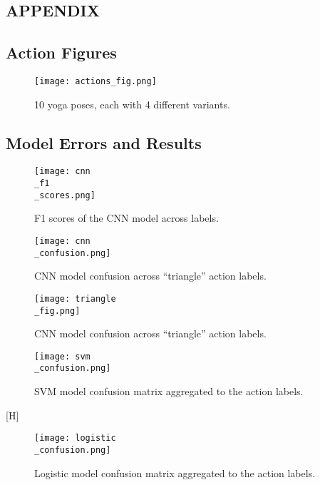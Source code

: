 \documentclass[
	a4paper, %
	10pt, %
	unnumberedsections, %
	twoside, %
]{t0004}
\begin{document}


\clearpage
\begin{appendices}
\onecolumn
\section*{APPENDIX}
\subsection{Action Figures}

\begin{figure}[H]
	\texttt{[image: actions\_fig.png]}
	\caption{10 yoga poses, each with 4 different variants.}
	\label{fig:actionsfig}
\end{figure}

\subsection{Model Errors and Results}

\begin{figure}[H]
	\texttt{[image: cnn\\\_f1\\\_scores.png]}
	\caption{F1 scores of the CNN model across labels.}
	\label{fig:f1cnn}
\end{figure}

\begin{figure}[H]
	\texttt{[image: cnn\\\_confusion.png]}
	\caption{CNN model confusion across ``triangle'' action labels.}
	\label{fig:f1cnncf}
\end{figure}

\begin{figure}[H]
	\texttt{[image: triangle\\\_fig.png]}
	\caption{CNN model confusion across ``triangle'' action labels.}
	\label{fig:trianglecnn}
\end{figure}

\begin{figure}[H]
	\texttt{[image: svm\\\_confusion.png]}
	\caption{SVM model confusion matrix aggregated to the action labels.}
	\label{fig:svmconfusion}
\end{figure}[H]

\begin{figure}[H]
	\texttt{[image: logistic\\\_confusion.png]}
	\caption{Logistic model confusion matrix aggregated to the action labels.}
	\label{fig:logisticconfusion}
\end{figure}


\end{appendices}
\end{document}
